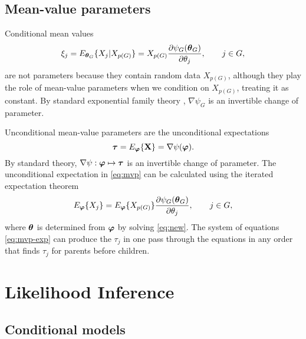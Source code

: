 \subsection{Mean-value parameters}

Conditional mean values
\begin{equation} \label{eq:mvp-cond}
   \xi_j
   =
   E_{{\boldsymbol{\theta}}_G} \{ X_j | X_{p(G)} \}
   =
   X_{p(G)} \frac{\partial \psi_G({\boldsymbol{\theta}}_G)}{\partial \theta_j},
   \qquad j \in G,
\end{equation}
are not parameters because they contain random data $X_{p(G)}$,
although they play the role of mean-value parameters when
we condition on $X_{p(G)}$, treating it as constant.
By standard exponential family theory \citep[p.~121]{barndorff},
$\nabla \psi_G$ %
is an invertible change of parameter.

Unconditional mean-value parameters are the unconditional expectations
\begin{equation} \label{eq:mvp}
   {\boldsymbol{\tau}}
   =
   E_{\boldsymbol{\varphi}} \{ \mathbf{X} \}
   =
   \nabla \psi({\boldsymbol{\varphi}}).
\end{equation}
By standard theory, $\nabla \psi : {\boldsymbol{\varphi}} \mapsto {\boldsymbol{\tau}}$
is an invertible change of parameter.
The unconditional expectation in \eqref{eq:mvp} can be calculated
using the iterated expectation theorem
\begin{equation} \label{eq:mvp-exp}
   E_{\boldsymbol{\varphi}} \{ X_j \}
   =
   E_{\boldsymbol{\varphi}} \{ X_{p(G)} \}
   \frac{\partial \psi_G({\boldsymbol{\theta}}_G)}{\partial \theta_j},
   \qquad j \in G,
\end{equation}
where ${\boldsymbol{\theta}}$ is determined from ${\boldsymbol{\varphi}}$ by solving
\eqref{eq:new}.
The system of equations \eqref{eq:mvp-exp} can produce the $\tau_j$
in one pass through the equations in any order
that finds $\tau_j$ for parents before children.

\section{Likelihood Inference}

\subsection{Conditional models} \label{sec:CEFth}


